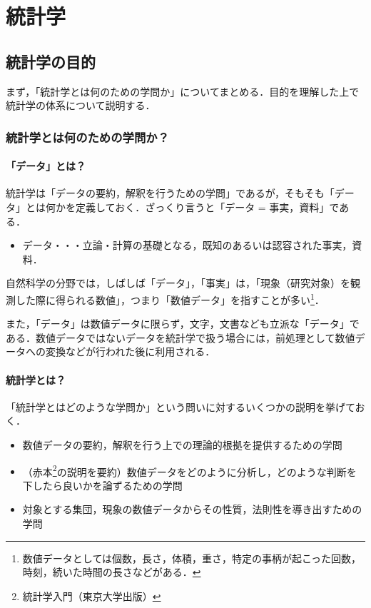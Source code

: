 \part{統計学}

\chapter{統計学の目的}

まず，「統計学とは何のための学問か」についてまとめる．目的を理解した上で統計学の体系について説明する．

\section{統計学とは何のための学問か？}

\subsection{「データ」とは？}

統計学は「データの要約，解釈を行うための学問」であるが，そもそも「データ」とは何かを定義しておく．ざっくり言うと「データ = 事実，資料」である．

\begin{itemize}
    \item データ・・・立論・計算の基礎となる，既知のあるいは認容された事実，資料．
\end{itemize}

自然科学の分野では，しばしば「データ」，「事実」は，「現象（研究対象）を観測した際に得られる数値」，つまり「数値データ」を指すことが多い\footnote{数値データとしては個数，長さ，体積，重さ，特定の事柄が起こった回数，時刻，続いた時間の長さなどがある．}．

また，「データ」は数値データに限らず，文字，文書なども立派な「データ」である．数値データではないデータを統計学で扱う場合には，前処理として数値データへの変換などが行われた後に利用される．

\subsection{統計学とは？}

「統計学とはどのような学問か」という問いに対するいくつかの説明を挙げておく．

\begin{itemize}
    \item 数値データの要約，解釈を行う上での理論的根拠を提供するための学問
    \item （赤本\footnote{統計学入門（東京大学出版）}の説明を要約）数値データをどのように分析し，どのような判断を下したら良いかを論ずるための学問
    \item 対象とする集団，現象の数値データからその性質，法則性を導き出すための学問
\end{itemize}

